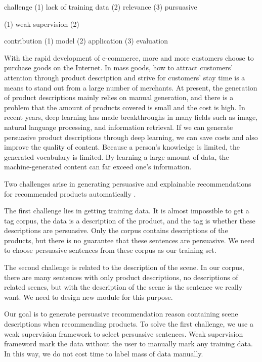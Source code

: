 \documentclass[sigconf]{acmart}
\begin{document}
challenge (1) lack of training data (2) relevance (3) pursuasive 


(1) weak supervision (2) 

contribution
(1) model
(2) application
(3) evaluation




With the rapid development of e-commerce, more and more customers choose to purchase goods on the Internet. In mass goods, how to attract customers' attention through product description and strive for customers' stay time is a means to stand out from a large number of merchants. At present, the generation of product descriptions mainly relies on manual generation, and there is a problem that the amount of products covered is small and the cost is high. In recent years, deep learning has made breakthroughs in many fields such as image, natural language processing, and information retrieval. If we can generate persuasive product descriptions through deep learning, we can save costs and also improve the quality of content. Because a person's knowledge is limited, the generated vocabulary is limited. By learning a large amount of data, the machine-generated content can far exceed one's information.

Two challenges arise in generating persuasive and explainable recommendations for recommended products automatically .

The first challenge lies in getting training data. It is almost impossible to get a tag corpus, the data is a description of the product, and the tag is whether these descriptions are persuasive. Only the corpus contains descriptions of the products, but there is no guarantee that these sentences are persuasive. We need to choose persuasive sentences from these corpus as our training set.

The second challenge is related to the description of the scene. In our corpus, there are many sentences with only product descriptions, no descriptions of related scenes, but with the description of the scene is the sentence we really want. We need to design new module for this purpose.

Our goal is to generate persuasive recommendation reason containing scene descriptions when recommending products. To solve the first challenge, we use a weak supervision framework to select persuasive sentences. Weak supervision frameword mark the data without the user to manually mark any training data. In this way, we do not cost time to label mass of data manually.
\end{document}
